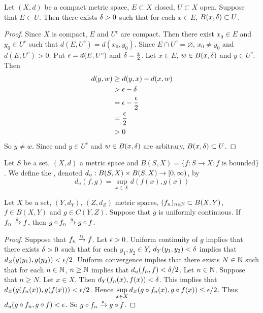 \documentclass{book}
\begin{document}
\begin{ex} \lex{}
	Let $(X, d)$ be a compact metric space, $E \subset X$ closed, $U \subset X$ open. Suppose that $E \subset U$. Then there exists $\delta >0$ such that for each $x \in E$, $B(x, \delta) \subset U$.
\end{ex}	

\begin{proof}
	Since $X$ is compact, $E$ and $U^c$ are compact. Then there exist $x_0 \in E$ and $y_0 \in U^c$ such that $d(E, U^c) = d(x_0,y_0)$. Since $E \cap U^c = \varnothing$, $x_0 \neq y_0$ and $d(E, U^c) >0$. Put $\epsilon = d(E, U^c)$ and $\delta = \frac{\epsilon}{2}$.  Let $x \in E$, $w \in B(x, \delta)$ and $y \in U^c$. Then 
	\begin{align*}
		d(y, w) 
		&\geq d(y, x) - d(x, w) \\
		&> \epsilon - \delta \\
		&= \epsilon - \frac{\epsilon}{2} \\
		&= \frac{\epsilon}{2} \\
		&> 0
	\end{align*}	  
	So $y \neq w$. Since and $y \in U^c$ and $w \in B(x, \delta)$ are arbitrary, $B(x, \delta) \subset U$.
\end{proof}

\begin{defn} \ld{}
	Let $S$ be a set, $(X, d)$ a metric space and $B(S, X) = \{f: S \rightarrow X: f \text{ is bounded} \}$. We define the , denoted $d_u:B(S,X) \times B(S,X) \rightarrow [0,\infty)$, by $$d_u(f, g) = \sup_{x \in X}d(f(x), g(x)) $$ 
\end{defn}

\begin{ex} 
	Let $X$ be a set, $(Y, d_Y)$, $(Z, d_Z)$ metric spaces, $(f_n)_{n \in \mathbb{N}} \subset B(X, Y)$, $f \in B(X, Y)$ and $g \in C(Y, Z)$. Suppose that $g$ is uniformly continuous. If $f_n \xrightarrow{\text{u}} f$, then $g \circ f_n \xrightarrow{\text{u}} g \circ f$. 
\end{ex}

\begin{proof}
	Suppose that $f_n \xrightarrow{\text{u}} f$. Let $\epsilon >0$. Uniform continuity of $g$ implies that there exists $\delta >0$ such that for each $y_1, y_2 \in Y$, $d_Y(y_1, y_2) < \delta$ implies that $d_Z(g(y_1), g(y_2)) < \epsilon/2$.  Uniform convergence implies that there exists $N \in \mathbb{N}$ such that for each $n \in \mathbb{N}$, $n \geq \mathbb{N}$ implies that $d_u(f_n, f) < \delta/2$. Let $n \in \mathbb{N}$. Suppose that $n \geq N$. Let $x \in X$. Then $d_Y(f_n(x), f(x)) < \delta$. This implies that $d_Z(g(f_n(x)), g(f(x))) < \epsilon/2$. Hence $\sup\limits_{x \in X} d_Z(g \circ f_n(x), g \circ f(x)) \leq \epsilon/2$. Thus $d_u(g \circ f_n , g \circ f) < \epsilon$. So $g \circ f_n \xrightarrow{\text{u}} g \circ f$.
\end{proof}
\end{document}
